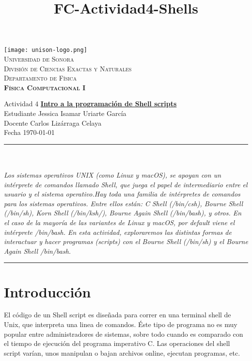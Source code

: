 \documentclass[12pt]{article}
\title{FC-Actividad4-Shells}
\begin{document}

\begin{center}


\texttt{[image: unison-logo.png]}~\\[0.8cm]

\textsc{\LARGE Universidad de Sonora}\\[0.1cm]
\textsc{Divisi\'on de Ciencias Exactas y Naturales}\\[0.1cm]
\textsc{Departamento de F\'isica \\[0.5cm] \textbf{F\'isica Computacional I}}\\%

\end{center}
\noindent
Actividad 4 \dotfill \textbf{\underline{Intro a la programaci\'on de Shell scripts}}\\
Estudiante \dotfill Jessica Isamar Uriarte Garc\'ia \\
Docente \dotfill Carlos Liz\'arraga Celaya \\
Fecha \dotfill \today \\
\rule{\linewidth}{0.5pt} \\[6pt] 
\abstractname{\\ \emph{ \scriptsize{  \baselinestretch Los sistemas operativos UNIX (como Linux y macOS), se apoyan con un int\'erprete de comandos llamado \textit{Shell}, que juega el papel de intermediario entre el usuario y el sistema operativo.Hay toda una familia de int\'erpretes de comandos para los sistemas operativos. Entre ellos est\'an:  C Shell (/bin/csh), Bourne Shell (/bin/sh), Korn Shell (/bin/ksh/), Bourne Again Shell (/bin/bash), y otros. En el caso de la mayor\'ia de las variantes de Linux y macOS, por default viene el int\'erprete /bin/bash. En esta actividad, exploraremos las distintas formas de interactuar y hacer programas (scripts) con el Bourne Shell (/bin/sh) y el Bourne Again Shell /bin/bash.\\} }}
\renewcommand{\baselinestretch}{0.6}
\rule{\linewidth}{2pt}  
\small\tableofcontents

\newpage

\section{Introducci\'on}
\noindent 
El c\'odigo de un Shell script es diseñada para correr en una terminal shell de Unix, que interpreta una linea de comandos. \'Este tipo de programa no es muy popular entre administradores de sistemas, sobre todo cuando es comparado con el tiempo de ejecuci\'on del programa imperativo C. Las operaciones del shell script var\'ian, unos manipulan o bajan archivos online, ejecutan programas, etc. 
\end{document}
